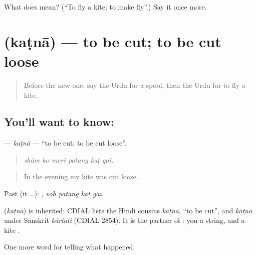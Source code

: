 \begin{tcolorbox}[breakable,colback=teal!4,colframe=teal!35!black,title={Before you move on}]
What does  mean? (\textquotedblleft{}To fly a kite; to make fly\textquotedblright{}.) Say it once more.
\end{tcolorbox}
\section[\texorpdfstring{\ur{کٹنا} (kaṭnā)}{کٹنا (kaṭnā)}]{ (kaṭnā) — to be cut; to be cut loose}

\label{lesson:UR-C319-katna-cut-loose}



\begin{quote}
Before the new one: say the Urdu for a spool, then the Urdu for to fly a kite.
\end{quote}

\subsection*{You'll want to know: }
\textbf{} — \emph{kaṭnā} — \textquotedblleft{}to be cut; to be cut loose\textquotedblright{}.

\begin{quote}
     
\end{quote}

\begin{quote}
\emph{shām ko merī patang kaṭ gaī.}
\end{quote}

\begin{quote}
In the evening my kite was cut loose.
\end{quote}

Past (it …):    , \emph{voh patang kaṭ gaī}.

\begin{cousinweb}
\textbf{} (\emph{kaṭnā}) is inherited: CDIAL lists the Hindi cousins \emph{kaṭnā}, \textquotedblleft{}to be cut\textquotedblright{}, and \emph{kāṭnā} under Sanskrit \emph{kártati} (CDIAL 2854). It is the partner of \textbf{}: you \textbf{} a string, and a kite \textbf{ }.
\end{cousinweb}

\begin{grammarlens}[title={What you've built}]
One more word for telling what happened.
\end{grammarlens}

